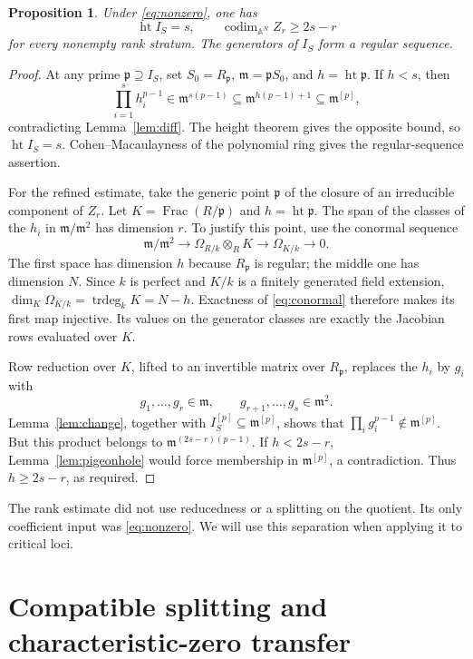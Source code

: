 \documentclass[11pt]{article}
\newtheorem{proposition}[theorem]{Proposition}
\theoremstyle{definition}\newtheorem{definition}[theorem]{Definition}
\theoremstyle{remark}\newtheorem{remark}[theorem]{Remark}
\DeclareMathOperator{\codim}{codim}
\DeclareMathOperator{\htop}{ht}
\newcommand{\A}{\mathbb A}
\newcommand{\m}{\mathfrak m}
\newcommand{\pp}{\mathfrak p}
\numberwithin{equation}{section}
\begin{document}
\begin{proposition}\label{prop:rank}
Under \eqref{eq:nonzero}, one has
\begin{equation}\label{eq:rankstrata}
 \htop I_S=s,\qquad \codim_{\A^N} Z_r\ge2s-r
\end{equation}
for every nonempty rank stratum. The generators of $I_S$ form a
regular sequence.
\end{proposition}
\begin{proof}
At any prime $\pp\supseteq I_S$, set $S_0=R_{\pp}$,
$\m=\pp S_0$, and $h=\htop\pp$. If $h<s$, then
\[
 \prod_{i=1}^{s}h_i^{p-1}\in\m^{s(p-1)}
 \subseteq\m^{h(p-1)+1}\subseteq\m^{[p]},
\]
contradicting Lemma~\ref{lem:diff}. The height theorem gives the
opposite bound, so $\htop I_S=s$. Cohen--Macaulayness of the
polynomial ring gives the regular-sequence assertion.

For the refined estimate, take the generic point $\pp$ of the
closure of an irreducible component of $Z_r$. Let
$K=\operatorname{Frac}(R/\pp)$ and $h=\htop\pp$.
The span of the classes of the $h_i$ in $\m/\m^2$ has dimension
$r$. To justify this point, use the conormal sequence
\begin{equation}\label{eq:conormal}
 \m/\m^2\longrightarrow\Omega_{R/k}\otimes_R K
       \longrightarrow\Omega_{K/k}\longrightarrow0.
\end{equation}
The first space has dimension $h$ because $R_{\pp}$ is regular;
the middle one has dimension $N$. Since $k$ is perfect and $K/k$
is a finitely generated field extension,
$\dim_K\Omega_{K/k}=\operatorname{trdeg}_kK=N-h$.
Exactness of \eqref{eq:conormal} therefore makes its first map
injective. Its values on the generator classes are exactly the
Jacobian rows evaluated over $K$.

Row reduction over $K$, lifted to an invertible matrix over
$R_{\pp}$, replaces the $h_i$ by $g_i$ with
\[
 g_1,\ldots,g_r\in\m,\qquad
 g_{r+1},\ldots,g_s\in\m^2.
\]
Lemma~\ref{lem:change}, together with $I_S^{[p]}\subseteq\m^{[p]}$,
shows that $\prod_i g_i^{p-1}\notin\m^{[p]}$.
But this product belongs to $\m^{(2s-r)(p-1)}$.
If $h<2s-r$, Lemma~\ref{lem:pigeonhole} would force membership
in $\m^{[p]}$, a contradiction. Thus $h\ge2s-r$, as required.
\end{proof}

The rank estimate did not use reducedness or a splitting on the
quotient. Its only coefficient input was \eqref{eq:nonzero}. We
will use this separation when applying it to critical loci.

\section{Compatible splitting and characteristic-zero transfer}
\end{document}
